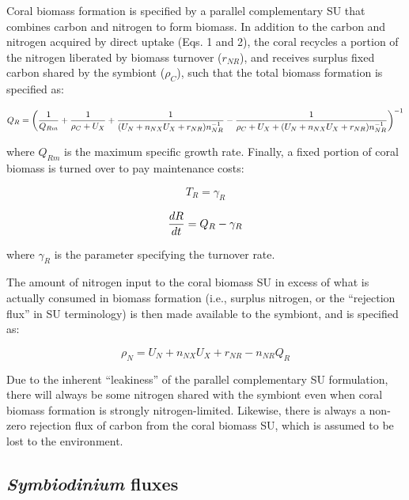 \documentclass[]{elsarticle} %
\begin{document}
Coral biomass formation is specified by a parallel complementary SU that
combines carbon and nitrogen to form biomass. In addition to the carbon
and nitrogen acquired by direct uptake (Eqs. 1 and 2), the coral
recycles a portion of the nitrogen liberated by biomass turnover
(\(r_{NR}\)), and receives surplus fixed carbon shared by the symbiont
(\(\rho_C\)), such that the total biomass formation is specified as:

\begin{equation} Q_R = \bigg({1 \over Q_{Rm}} + {1 \over {\rho_C + U_X}} + {1 \over {(U_N + n_{NX}U_X + r_{NR})n_{NR}^{-1}}} - {1 \over {{\rho_C + U_X} + (U_N + n_{NX}U_X + r_{NR})n_{NR}^{-1}}}\bigg)^{-1} \end{equation}

where \(Q_{Rm}\) is the maximum specific growth rate. Finally, a fixed
portion of coral biomass is turned over to pay maintenance costs:

\begin{equation} T_R = \gamma_R \end{equation}

\begin{equation} {dR \over dt} = Q_R - \gamma_R \end{equation}

where \(\gamma_R\) is the parameter specifying the turnover rate.

The amount of nitrogen input to the coral biomass SU in excess of what
is actually consumed in biomass formation (i.e., surplus nitrogen, or
the ``rejection flux'' in SU terminology) is then made available to the
symbiont, and is specified as:

\begin{equation} \rho_N = U_N + n_{NX}U_X + r_{NR} - n_{NR}Q_R \end{equation}

Due to the inherent ``leakiness'' of the parallel complementary SU
formulation, there will always be some nitrogen shared with the symbiont
even when coral biomass formation is strongly nitrogen-limited.
Likewise, there is always a non-zero rejection flux of carbon from the
coral biomass SU, which is assumed to be lost to the environment.

\subsection{\texorpdfstring{\emph{Symbiodinium}
fluxes}{Symbiodinium fluxes}}\label{symbiodinium-fluxes}
\end{document}
